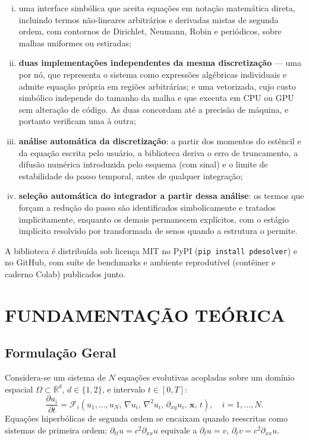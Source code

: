 \documentclass[10pt,brazil,english]{article}
\begin{document}
\begin{enumerate}[(i)]
\item uma interface simbólica que aceita equações em notação matemática direta, incluindo termos não-lineares arbitrários e derivadas mistas de segunda ordem, com contornos de Dirichlet, Neumann, Robin e periódicos, sobre malhas uniformes ou estiradas;

\item \textbf{duas implementações independentes da mesma discretização} --- uma por nó, que representa o sistema como expressões algébricas individuais e admite equação própria em regiões arbitrárias; e uma vetorizada, cujo custo simbólico independe do tamanho da malha e que executa em CPU ou GPU sem alteração de código. As duas concordam até a precisão de máquina, e portanto verificam uma à outra;

\item \textbf{análise automática da discretização}: a partir dos momentos do estêncil e da equação escrita pelo usuário, a biblioteca deriva o erro de truncamento, a difusão numérica introduzida pelo esquema (com sinal) e o limite de estabilidade do passo temporal, antes de qualquer integração;

\item \textbf{seleção automática do integrador a partir dessa análise}: os termos que forçam a redução do passo são identificados simbolicamente e tratados implicitamente, enquanto os demais permanecem explícitos, com o estágio implícito resolvido por transformada de senos quando a estrutura o permite.
\end{enumerate}

A biblioteca é distribuída sob licença MIT no PyPI (\texttt{pip install pdesolver}) e no GitHub, com suíte de benchmarks e ambiente reprodutível (contêiner e caderno Colab) publicados junto.

\section{FUNDAMENTAÇÃO TEÓRICA}

\subsection{Formulação Geral}

Considera-se um sistema de $N$ equações evolutivas acopladas sobre um domínio espacial $\Omega \subset \mathbb{R}^d$, $d \in \{1, 2\}$, e intervalo $t \in [0, T]$:
\begin{equation}
  \frac{\partial u_i}{\partial t} = \mathcal{F}_i\!\left(u_1, \ldots,
  u_N,\, \nabla u_i,\, \nabla^2 u_i,\, \partial_{xy} u_i,\, \mathbf{x},\, t\right),
  \quad i = 1, \ldots, N.
  \label{eq:edp_geral}
\end{equation}
Equações hiperbólicas de segunda ordem se encaixam quando reescritas como sistemas de primeira ordem: $\partial_{tt} u = c^2 \partial_{xx} u$ equivale a $\partial_t u = v$, $\partial_t v = c^2 \partial_{xx} u$.
\end{document}
